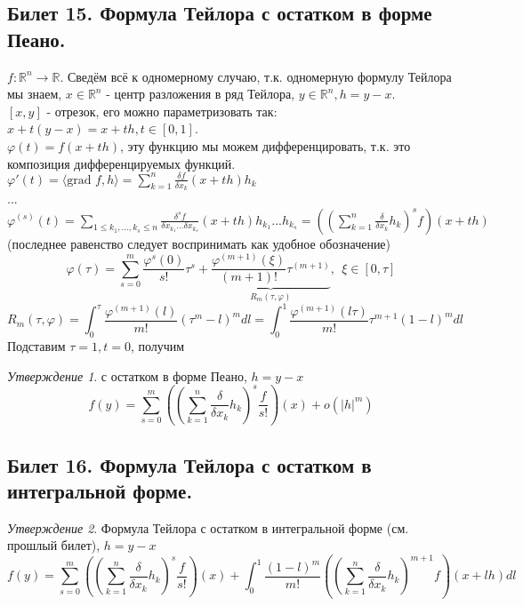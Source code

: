 \documentclass[a4paper]{article}
\theoremstyle{indented}
\theoremstyle{definition}
\theoremstyle{remark}
\newtheorem{stat}{Утверждение}
\begin{document}
\subsection{Билет 15. Формула Тейлора с остатком в форме Пеано.}


$f: \mathbb{R}^n \to \mathbb{R}$. Сведём всё к одномерному случаю, т.к. одномерную формулу Тейлора мы знаем,
$x\in \mathbb{R}^n$ - центр разложения в ряд Тейлора, $y\in \mathbb{R}^n, h=y-x$.\\
$[x,y]$ - отрезок, его можно параметризовать так: $x+t(y-x)=x+th, t\in [0,1]$.\\
$\varphi (t) = f(x+th)$, эту функцию мы можем дифференцировать, т.к. это композиция дифференцируемых функций.\\
$\varphi' (t) = \langle \textrm{grad } f, h \rangle = \sum\limits_{k=1}^{n} \frac{\delta f}{\delta x_k} (x+th) h_k $\\
...\\
$\varphi^{(s)} (t) = \sum\limits_{1 \leq k_1,...,k_s \leq n}^{} \frac{\delta^s f}{\delta x_{k_1} ... \delta x_{k_s}} (x+th) h_{k_1}...h_{k_s} = \left(\left(\sum\limits_{k=1}^{n} \frac{\delta}{\delta x_k} h_k\right)^s f\right) (x+th)$\\
(последнее равенство следует воспринимать как удобное обозначение)
\[\varphi(\tau)=\sum\limits_{s=0}^{m} \frac{\varphi^s(0)}{s!}\tau^s + \underbrace{\frac{\varphi^{(m+1)}(\xi)}{(m+1)!}\tau^{(m+1)}}_{R_m(\tau,\varphi)}, \ \  \xi \in [0, \tau] \]
\[R_m(\tau,\varphi) = \int_{0}^{\tau} \frac{\varphi^{(m+1)}(l)}{m!}(\tau^{m}-l)^m dl = \int_{0}^{1} \frac{\varphi^{(m+1)}(l\tau)}{m!} \tau^{m+1} (1-l)^m dl \]
Подставим $\tau=1, t=0$, получим
\begin{stat}
     с остатком в форме Пеано, $h=y-x$
    \[
        f(y) = \sum\limits_{s=0}^{m} \left(\left(\sum\limits_{k=1}^{n} \frac{\delta}{\delta x_k} h_k\right)^s \frac{f}{s!} \right) (x) + o(|h|^m)
    \]
\end{stat}

\subsection{Билет 16. Формула Тейлора с остатком в интегральной форме.}


\begin{stat}
    Формула Тейлора с остатком в интегральной форме (см. прошлый билет), $h=y-x$
    \[
        f(y) = \sum\limits_{s=0}^{m} \left(\left(\sum\limits_{k=1}^{n} \frac{\delta}{\delta x_k} h_k\right)^s \frac{f}{s!} \right) (x) + \int_{0}^{1} \frac{(1-l)^m}{m!} \left(\left(\sum\limits_{k=1}^{n} \frac{\delta}{\delta x_k} h_k\right)^{m+1} f \right) (x+lh) dl
    \]
\end{stat}
\end{document}
